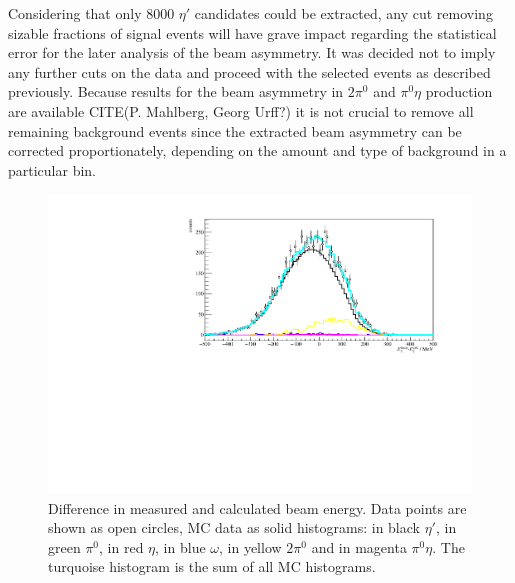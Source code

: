 Considering that only 8000 $\eta'$ candidates could be extracted, any cut removing sizable fractions of signal events will have grave impact regarding the statistical error for the later analysis of the beam asymmetry. It was decided not to imply any further cuts on the data and proceed with the selected events as described previously. Because results for the beam asymmetry in $2\pi^0$ and $\pi^0\eta$ production are available {\color{red} CITE(P. Mahlberg, Georg Urff?)} it is not crucial to remove all remaining background events since the extracted beam asymmetry can be corrected proportionately, depending on the amount and type of background in a particular bin. 
\begin{figure}[htbp]
	\centering
	\includegraphics[width=\linewidth]{../figs/hydrogen/calc_beam.pdf}
	\caption{Difference in measured and calculated beam energy. Data points are shown as open circles, MC data as solid histograms: in black $\eta'$, in green $\pi^0$, in red $\eta$, in blue $\omega$, in yellow $2\pi^0$ and in magenta $\pi^0\eta$. The turquoise histogram is the sum of all MC histograms.}
	\label{fig:beame}
\end{figure}

